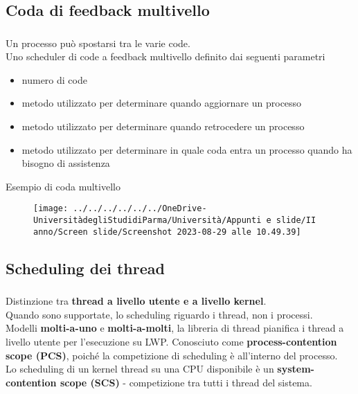 \documentclass{beamer}
\newenvironment{mainframe}{
	\begin{frame}
		\frametitle{\insertsubsection}
		\framesubtitle{\insertsection}
	}{
	\end{frame}
}
\begin{document}
\subsection{Coda di feedback multivello}
\begin{mainframe}
	Un processo può spostarsi tra le varie code.\\
	Uno scheduler di code a feedback multivello definito dai seguenti parametri
	\begin{itemize}
		\item numero di code
		\item metodo utilizzato per determinare quando aggiornare un processo
		\item metodo utilizzato per determinare quando retrocedere un processo
		\item metodo utilizzato per determinare in quale coda entra un processo quando ha bisogno di assistenza
	\end{itemize}
\end{mainframe}
\begin{frame}{Esempio di coda multivello}
	\begin{figure}
		\centering
		\texttt{[image: ../../../../../../OneDrive-UniversitàdegliStudidiParma/Università/Appunti e slide/II anno/Screen slide/Screenshot 2023-08-29 alle 10.49.39]}
	\end{figure}
\end{frame}
\subsection{Scheduling dei thread}
\begin{mainframe}
	Distinzione tra \textbf{thread a livello utente e a livello kernel}.\\
	Quando sono supportate, lo scheduling riguardo i thread, non i processi.\\
	Modelli \textbf{molti-a-uno} e \textbf{molti-a-molti}, la libreria di thread pianifica i thread a livello utente per l'esecuzione su LWP. Conosciuto come \textbf{process-contention scope (PCS)}, poiché la competizione di scheduling è all'interno del processo.\\
	Lo scheduling di un kernel thread su una CPU disponibile è un \textbf{system-contention scope (SCS)} - competizione tra tutti i thread del sistema.
\end{mainframe}
\end{document}
